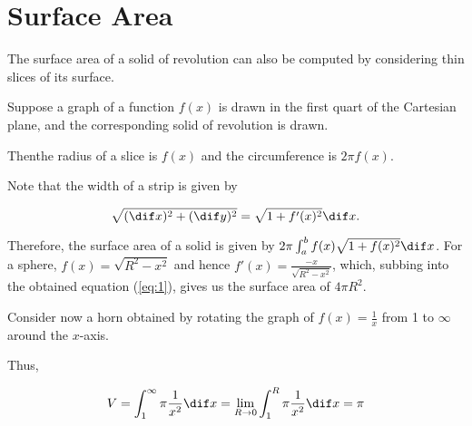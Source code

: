 \documentclass[11pt]{scrartcl}
\begin{document}
\section{Surface Area}

The surface area of a solid of revolution can also be computed by considering thin slices of its surface.

Suppose a graph of a function $f(x)$ is drawn in the first quart of the Cartesian plane, and the corresponding solid of revolution is drawn.

Thenthe radius of a slice is $f(x)$ and the circumference is $2\pi f(x)$.

Note that the width of a strip is given by

\begin{equation}
  \label{eq:1}
\sqrt{(\dif x) ^2 + (\dif y)^2}= \sqrt{1+f'(x)^2} \dif x.
\end{equation}

Therefore, the surface area of a solid is given by
$ 2\pi\int_a^b f(x) \sqrt{1+f(x)^2}\dif x$.  For a sphere,
$f(x) = \sqrt{R^2-x^2}$ and hence $f'(x) = \frac{-x}{\sqrt{R^2-x^2}}$,
which, subbing into the obtained equation (\ref{eq:1}), gives us the surface area of $4\pi R^2$.

Consider now a horn obtained by rotating the graph of
$f(x) = \frac{1}{x}$ from 1 to $\infty$ around the $x$-axis.

Thus,

\[V = \int_1^{\infty}\pi \frac{1}{x^2}\dif x = \lim_{R\to 0} \int_1^R \pi \frac{1}{x^2}\dif x = \pi\] 
\end{document}
